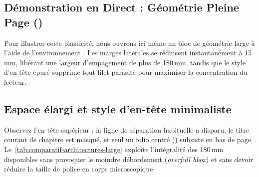 \begin{WideGeometry}
\activerStyleFocus

\section{Démonstration en Direct : Géométrie Pleine Page ()}
\label{sec:demo-geometrie-large}

Pour illustrer cette plasticité, nous ouvrons ici même un bloc de géométrie large
à l'aide de l'environnement .
Les marges latérales se réduisent instantanément à 15\,mm,
libérant une largeur d'empagement de plus de 180\,mm, tandis que le style d'en-tête épuré 
supprime tout filet parasite pour maximiser la concentration du lecteur.

\subsection{Espace élargi et style d'en-tête minimaliste }
Observez l'en-tête supérieur : la ligne de séparation habituelle a disparu,
le titre courant de chapitre est masqué,
et seul un folio centré (\code{---\,\thepage\,---}) subsiste en bas de page.
Le~\cref{tab:comparatif-architectures-large} exploite l'intégralité des 180\,mm disponibles
sans provoquer le moindre débordement (\textit{overfull hbox})
et sans devoir réduire la taille de police en corps microscopique.


\end{WideGeometry}
